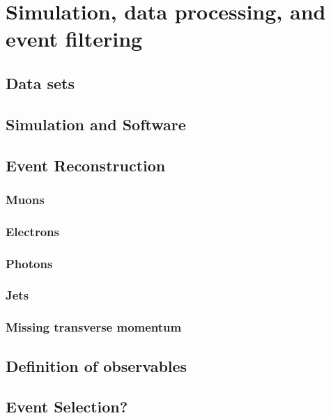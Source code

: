 \chapter{Simulation, data processing, and event filtering}\label{chap:reco}

\section{Data sets}



\section{Simulation and Software}
\section{Event Reconstruction}
\subsection{Muons}
\subsection{Electrons}
\subsection{Photons}
\subsection{Jets}
\subsection{Missing transverse momentum}
\section{Definition of observables}

\section{Event Selection?}
